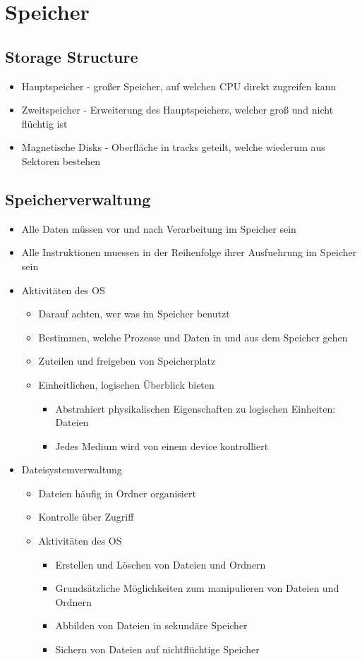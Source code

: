 \documentclass[a4paper]{scrreprt}
\begin{document}
\section{Speicher}
\subsection{Storage Structure}
\begin{itemize}
	\item Hauptspeicher - großer Speicher, auf welchen CPU direkt zugreifen kann
	\item Zweitspeicher - Erweiterung des Hauptspeichers, welcher groß und nicht flüchtig ist
	\item Magnetische Disks - Oberfläche in tracks geteilt, welche wiederum aus Sektoren bestehen
\end{itemize}

\subsection{Speicherverwaltung}
\begin{itemize}
	\item Alle Daten müssen vor und nach Verarbeitung im Speicher sein
	\item Alle Instruktionen muessen in der Reihenfolge ihrer Ausfuehrung im Speicher sein
	\item Aktivitäten des OS
		\begin{itemize}
			\item Darauf achten, wer was im Speicher benutzt
			\item Bestimmen, welche Prozesse und Daten in und aus dem Speicher gehen
			\item Zuteilen und freigeben von Speicherplatz
			\item Einheitlichen, logischen Überblick bieten
				\begin{itemize}
					\item Abstrahiert physikalischen Eigenschaften zu logischen Einheiten: Dateien
					\item Jedes Medium wird von einem device kontrolliert
				\end{itemize}
		\end{itemize}
	\item Dateisystemverwaltung
		\begin{itemize}
			\item Dateien häufig in Ordner organisiert
			\item Kontrolle über Zugriff
			\item Aktivitäten des OS
				\begin{itemize}
					\item Erstellen und Löschen von Dateien und Ordnern
					\item Grundsätzliche Möglichkeiten zum manipulieren von Dateien und Ordnern
					\item Abbilden von Dateien in sekundäre Speicher
					\item Sichern von Dateien auf nichtflüchtige Speicher
				\end{itemize}
		\end{itemize}
\end{itemize}
\end{document}
